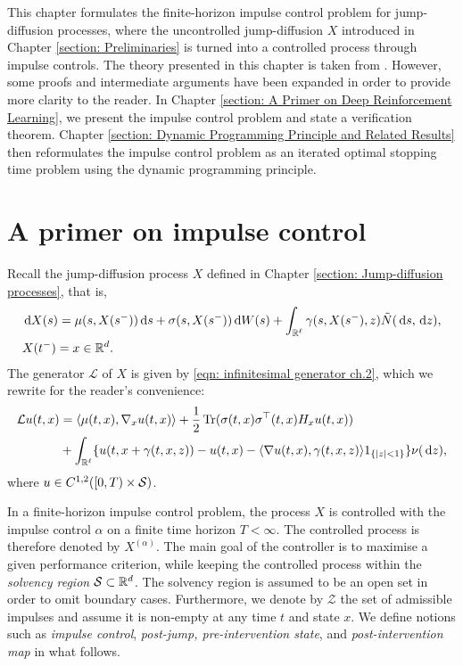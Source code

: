 \label{section: Impulse Control of Jump-Diffusion Processes}
This chapter formulates the finite-horizon impulse control problem for jump-diffusion processes, where the uncontrolled jump-diffusion $X$ introduced in Chapter \ref{section: Preliminaries} is turned into a controlled process through impulse controls. The theory presented in this chapter is taken from \cite[Chapters 9 and 10]{oksendal2007applied}. However, some proofs and intermediate arguments have been expanded in order to provide more clarity to the reader. In Chapter \ref{section: A Primer on Deep Reinforcement Learning}, we present the impulse control problem and state a verification theorem. Chapter \ref{section: Dynamic Programming Principle and Related Results} then reformulates the impulse control problem as an iterated optimal stopping time problem using the dynamic programming principle.

\section{A primer on impulse control}
\label{section: A Primer on Impulse Control Problems}
Recall the jump-diffusion process $X$ defined in Chapter \ref{section: Jump-diffusion processes}, that is, 
\begin{align}
    &\,\mathrm{d} X(s) = \mu(s,X(s^-)) \,\mathrm{d} s + \sigma(s, X(s^-)) \,\mathrm{d} W(s) + \int_{\mathbb R^\ell} \gamma (s,X(s^-),z) \tilde N (\,\mathrm{d} s, \,\mathrm{d} z), \nonumber \\
    &X(t^-) = x \in \mathbb{R}^d.
    \label{eqn: jump-diffusion SDE}
\end{align}
The generator $\mathcal L$ of $X$ is given by \eqref{eqn: infinitesimal generator ch.2}, which we rewrite for the reader's convenience:
\begin{align}
    \mathcal{L} u (t,x) &= \langle \mu(t,x), \nabla_x u (t,x) \rangle + \frac{1}{2} \operatorname{Tr} (\sigma(t,x)\sigma^\top(t,x)H_x u(t,x)) \nonumber\\
    &+ \int_{\mathbb{R}^\ell} \{u(t,x+\gamma(t,x,z)) - u (t,x) - \langle \nabla u (t,x), \gamma(t,x,z) \rangle 1_{\left\{|z|<1\right\}}\} \nu(\,\mathrm{d} z),
    \label{eqn: infinitesimal generator}
\end{align}
where $u \in C^{1,2}([0,T) \times \mathcal{S})$. 

In a finite-horizon impulse control problem, the process $X$ is controlled with the impulse control $\alpha$ on a finite time horizon $T<\infty$. The controlled process is therefore denoted by $X^{(\alpha)}$. The main goal of the controller is to maximise a given performance criterion, while keeping the controlled process within the \textit{solvency region} $\mathcal{S} \subset \mathbb{R}^d$. The solvency region is assumed to be an open set in order to omit boundary cases. Furthermore, we denote by $\mathcal Z$ the set of admissible impulses and assume it is non-empty at any time $t$ and state $x$. We define notions such as \emph{impulse control}, \emph{post-jump, pre-intervention state}, and \emph{post-intervention map} in what follows.
 
